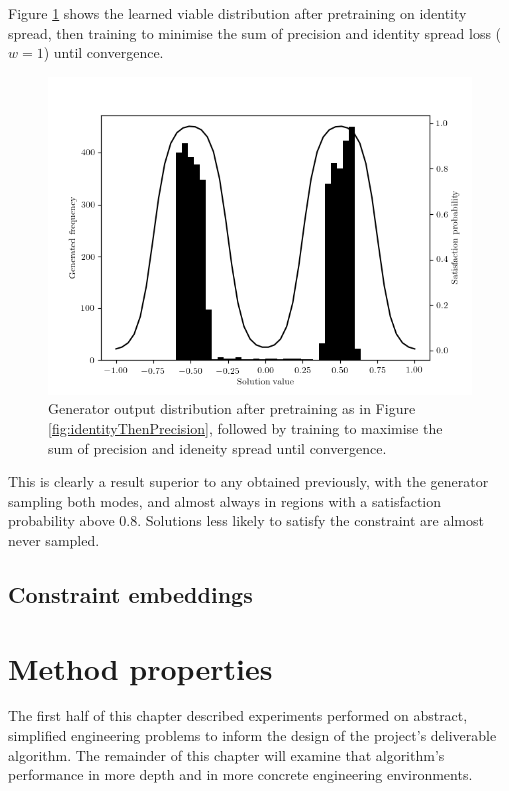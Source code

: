 \documentclass[../../main.tex]{subfiles}
\begin{document}
Figure \ref{fig:identityAndPrecision} shows the learned viable distribution after pretraining on identity spread, then training to minimise the sum of precision and identity spread loss ($w=1$) until convergence.
\begin{figure}[H]
    \begin{center}
    \includegraphics[width=\textwidth]{identityAndPrecision}
    \caption{
        Generator output distribution after pretraining as in Figure \ref{fig:identityThenPrecision}, followed by training to maximise the sum of precision and ideneity spread until convergence.
    }
    \label{fig:identityAndPrecision}
    \end{center}
\end{figure}
This is clearly a result superior to any obtained previously, with the generator sampling both modes, and almost always in regions with a satisfaction probability above $0.8$.
Solutions less likely to satisfy the constraint are almost never sampled.

\subsection{Constraint embeddings}

\section{Method properties}

The first half of this chapter described experiments performed on abstract, simplified engineering problems to inform the design of the project's deliverable algorithm.
The remainder of this chapter will examine that algorithm's performance in more depth and in more concrete engineering environments.
\end{document}
